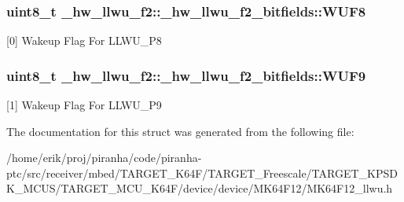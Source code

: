 \subsubsection[{\texorpdfstring{W\+U\+F8}{WUF8}}]{\setlength{\rightskip}{0pt plus 5cm}uint8\+\_\+t \+\_\+hw\+\_\+llwu\+\_\+f2\+::\+\_\+hw\+\_\+llwu\+\_\+f2\+\_\+bitfields\+::\+W\+U\+F8}\hypertarget{struct__hw__llwu__f2_1_1__hw__llwu__f2__bitfields_a9c1dcedec50f772fced12ad75cabed7c}{}\label{struct__hw__llwu__f2_1_1__hw__llwu__f2__bitfields_a9c1dcedec50f772fced12ad75cabed7c}
\mbox{[}0\mbox{]} Wakeup Flag For L\+L\+W\+U\+\_\+\+P8 
\subsubsection[{\texorpdfstring{W\+U\+F9}{WUF9}}]{\setlength{\rightskip}{0pt plus 5cm}uint8\+\_\+t \+\_\+hw\+\_\+llwu\+\_\+f2\+::\+\_\+hw\+\_\+llwu\+\_\+f2\+\_\+bitfields\+::\+W\+U\+F9}\hypertarget{struct__hw__llwu__f2_1_1__hw__llwu__f2__bitfields_a00dafbf02b05fcefa0e92465bcaf44af}{}\label{struct__hw__llwu__f2_1_1__hw__llwu__f2__bitfields_a00dafbf02b05fcefa0e92465bcaf44af}
\mbox{[}1\mbox{]} Wakeup Flag For L\+L\+W\+U\+\_\+\+P9 

The documentation for this struct was generated from the following file\+:\begin{DoxyCompactItemize}
\item 
/home/erik/proj/piranha/code/piranha-\/ptc/src/receiver/mbed/\+T\+A\+R\+G\+E\+T\+\_\+\+K64\+F/\+T\+A\+R\+G\+E\+T\+\_\+\+Freescale/\+T\+A\+R\+G\+E\+T\+\_\+\+K\+P\+S\+D\+K\+\_\+\+M\+C\+U\+S/\+T\+A\+R\+G\+E\+T\+\_\+\+M\+C\+U\+\_\+\+K64\+F/device/device/\+M\+K64\+F12/M\+K64\+F12\+\_\+llwu.\+h\end{DoxyCompactItemize}
